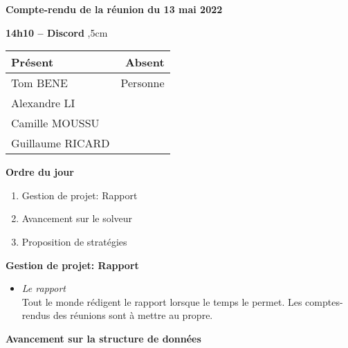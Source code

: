 \documentclass[12pt,a4paper,final]{report}
\begin{document}
\begin{center}
\Large \textbf{Compte-rendu de la réunion du 13 mai 2022}
\end{center}
\textbf{14h10 -- Discord}
,5cm

\begin{center}
\begin{tabular}{|l|r|}
    \hline
    Présent & Absent \\
    \hline
    Tom BENE & Personne \\
    Alexandre LI & \\
    Camille MOUSSU & \\
    Guillaume RICARD  & \\
    \hline
\end{tabular}
\end{center}

\begin{flushleft}
    \textbf{Ordre du jour}
\end{flushleft}

\begin{enumerate}
    \item Gestion de projet: Rapport
	\item Avancement sur le solveur
	\item Proposition de stratégies
\end{enumerate}

\begin{flushleft}
    \textbf{Gestion de projet: Rapport}
\end{flushleft}

\begin{itemize}
    \item \textit{Le rapport} \\
    Tout le monde rédigent le rapport lorsque le temps le permet. Les comptes-rendus des réunions sont à mettre au propre.
\end{itemize}

\begin{flushleft}
    \textbf{Avancement sur la structure de données}
\end{flushleft}
\end{document}

